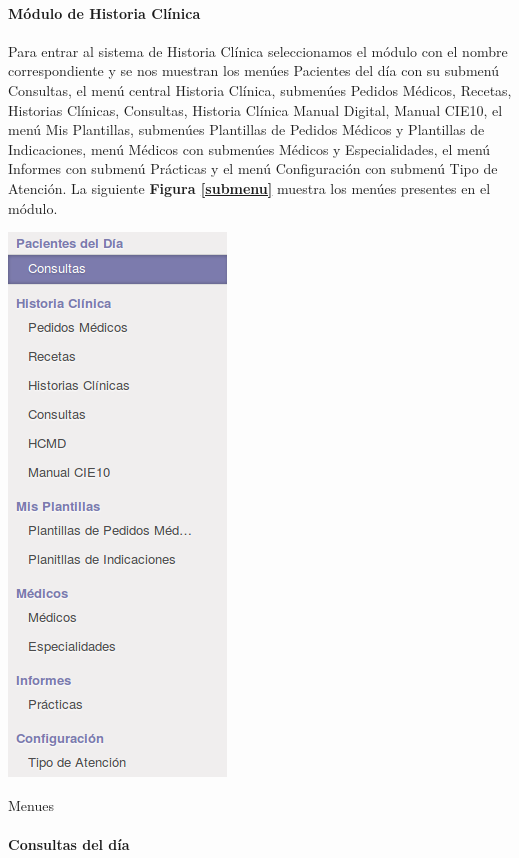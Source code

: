 \paragraph{Módulo de Historia Clínica}

Para entrar al sistema de Historia Clínica seleccionamos el módulo con el nombre correspondiente y se nos muestran los menúes Pacientes del día con su submenú Consultas, el menú central Historia Clínica, submenúes Pedidos Médicos, Recetas, Historias Clínicas, Consultas, Historia Clínica Manual Digital, Manual CIE10, el menú Mis Plantillas, submenúes Plantillas de Pedidos Médicos y Plantillas de Indicaciones, menú Médicos con submenúes Médicos y Especialidades, el menú Informes con submenú Prácticas y el menú Configuración con submenú Tipo de Atención. La siguiente \textbf{Figura \ref{submenu}} muestra los menúes presentes en el módulo.

\begin{correccionFigure}[h]
      \centering
      \includegraphics[height=.3\textheight]{img/tp1/HE/MenuHC}
      \caption{Menues}
      \label{submenu}
\end{correccionFigure}


\paragraph{Consultas del día}

